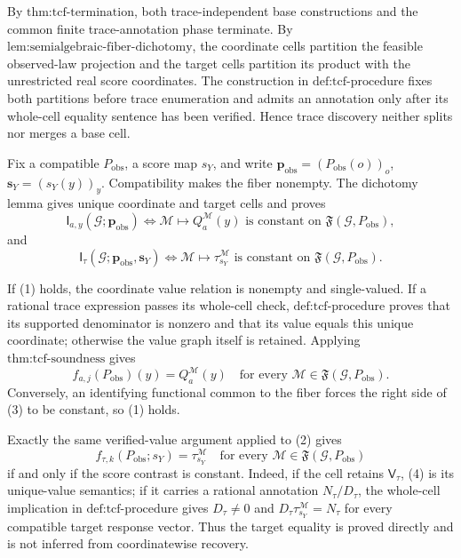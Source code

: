 By \(\text{thm:tcf-termination}\), both trace-independent base constructions and the common finite trace-annotation phase terminate. By \(\text{lem:semialgebraic-fiber-dichotomy}\), the coordinate cells partition the feasible observed-law projection and the target cells partition its product with the unrestricted real score coordinates. The construction in \(\text{def:tcf-procedure}\) fixes both partitions before trace enumeration and admits an annotation only after its whole-cell equality sentence has been verified. Hence trace discovery neither splits nor merges a base cell.

Fix a compatible \(P_{\mathrm{obs}}\), a score map \(s_Y\), and write \(\mathbf p_{\mathrm{obs}}=(P_{\mathrm{obs}}(o))_o\), \(\mathbf s_Y=(s_Y(y))_y\). Compatibility makes the fiber nonempty. The dichotomy lemma gives unique coordinate and target cells and proves
\[
\mathsf I_{a,y}(\mathcal G;\mathbf p_{\mathrm{obs}})
\Longleftrightarrow
\mathcal M\mapsto Q_a^{\mathcal M}(y)
\text{ is constant on }\mathfrak F(\mathcal G,P_{\mathrm{obs}}),
\tag{1}
\]
and
\[
\mathsf I_{\tau}(\mathcal G;\mathbf p_{\mathrm{obs}},\mathbf s_Y)
\Longleftrightarrow
\mathcal M\mapsto\tau_{s_Y}^{\mathcal M}
\text{ is constant on }\mathfrak F(\mathcal G,P_{\mathrm{obs}}).
\tag{2}
\]

If (1) holds, the coordinate value relation is nonempty and single-valued. If a rational trace expression passes its whole-cell check, \(\text{def:tcf-procedure}\) proves that its supported denominator is nonzero and that its value equals this unique coordinate; otherwise the value graph itself is retained. Applying \(\text{thm:tcf-soundness}\) gives
\[
f_{a,j}(P_{\mathrm{obs}})(y)=Q_a^{\mathcal M}(y)
\quad
\text{for every }\mathcal M\in\mathfrak F(\mathcal G,P_{\mathrm{obs}}).
\tag{3}
\]
Conversely, an identifying functional common to the fiber forces the right side of (3) to be constant, so (1) holds.

Exactly the same verified-value argument applied to (2) gives
\[
f_{\tau,k}(P_{\mathrm{obs}};s_Y)=\tau_{s_Y}^{\mathcal M}
\quad
\text{for every }\mathcal M\in\mathfrak F(\mathcal G,P_{\mathrm{obs}})
\tag{4}
\]
if and only if the score contrast is constant. Indeed, if the cell retains \(\mathsf V_{\tau}\), (4) is its unique-value semantics; if it carries a rational annotation \(N_{\tau}/D_{\tau}\), the whole-cell implication in \(\text{def:tcf-procedure}\) gives \(D_{\tau}\neq0\) and \(D_{\tau}\tau_{s_Y}^{\mathcal M}=N_{\tau}\) for every compatible target response vector. Thus the target equality is proved directly and is not inferred from coordinatewise recovery.


